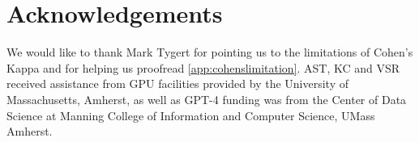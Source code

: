 \section {Acknowledgements}
We would like to thank Mark Tygert for pointing us to the limitations of Cohen's Kappa and for helping us proofread \cref{app:cohenslimitation}.
AST, KC and VSR received assistance from GPU facilities provided by the University of Massachusetts, Amherst,  as well as GPT-4 funding was from the Center of Data Science at Manning College of Information and Computer Science, UMass Amherst.
